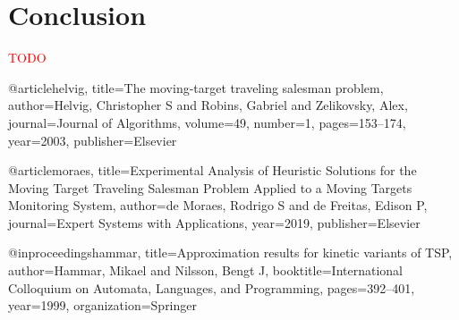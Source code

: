 \documentclass[english,version-2019-07]{uzl-thesis}
\begin{document}
\chapter{Conclusion}


%

\textcolor{red}{TODO}



%

\begin{bibtex-entries}

@article{helvig,
  title={The moving-target traveling salesman problem},
  author={Helvig, Christopher S and Robins, Gabriel and Zelikovsky, Alex},
  journal={Journal of Algorithms},
  volume={49},
  number={1},
  pages={153--174},
  year={2003},
  publisher={Elsevier}
}

@article{moraes,
  title={Experimental Analysis of Heuristic Solutions for the Moving Target Traveling Salesman Problem Applied to a Moving Targets Monitoring System},
  author={de Moraes, Rodrigo S and de Freitas, Edison P},
  journal={Expert Systems with Applications},
  year={2019},
  publisher={Elsevier}
}

@inproceedings{hammar,
  title={Approximation results for kinetic variants of TSP},
  author={Hammar, Mikael and Nilsson, Bengt J},
  booktitle={International Colloquium on Automata, Languages, and Programming},
  pages={392--401},
  year={1999},
  organization={Springer}
}


\end{bibtex-entries}
\end{document}
